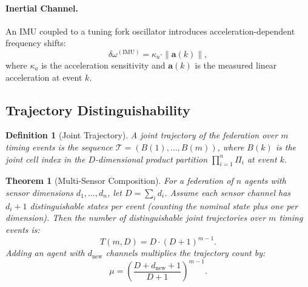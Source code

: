 \documentclass[twocolumn,10pt]{article}
\newtheorem{theorem}{Theorem}[section]
\newtheorem{definition}{Definition}[section]
\begin{document}
\paragraph{Inertial Channel.}
An IMU coupled to a tuning fork oscillator introduces acceleration-dependent
frequency shifts:
\[
  \delta\omega^{(\mathrm{IMU})} = \kappa_a \cdot \|\mathbf{a}(k)\|,
\]
where $\kappa_a$ is the acceleration sensitivity and $\mathbf{a}(k)$ is the
measured linear acceleration at event $k$.

\subsection{Trajectory Distinguishability}

\begin{definition}[Joint Trajectory]
\label{def:trajectory}
A \emph{joint trajectory} of the federation over $m$ timing events is the
sequence $\mathcal{T} = \left(B(1), \ldots, B(m)\right)$, where $B(k)$ is the
joint cell index in the $D$-dimensional product partition
$\prod_{i=1}^{n}\Pi_i$ at event $k$.
\end{definition}

\begin{theorem}[Multi-Sensor Composition]
\label{thm:composition}
For a federation of $n$ agents with sensor dimensions $d_1, \ldots, d_n$, let
$D = \sum_i d_i$. Assume each sensor channel has $d_i + 1$ distinguishable
states per event (counting the nominal state plus one per dimension). Then the
number of distinguishable joint trajectories over $m$ timing events is:
\begin{equation}
\label{eq:T}
  T(m, D) = D \cdot (D+1)^{m-1}.
\end{equation}
Adding an agent with $d_{\mathrm{new}}$ channels multiplies the trajectory
count by:
\begin{equation}
\label{eq:multiplier}
  \mu = \left(\frac{D + d_{\mathrm{new}} + 1}{D+1}\right)^{m-1}.
\end{equation}
\end{theorem}
\end{document}
